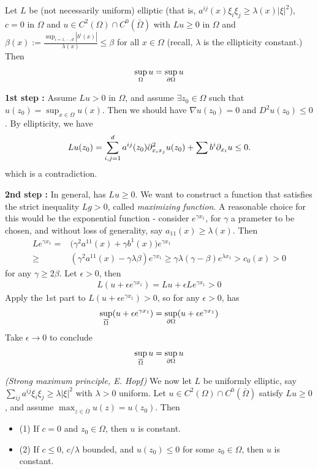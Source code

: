 \documentclass[12pt,a4paper]{article}
\newenvironment{proof}
{\begin{changemargin}{1cm}{0.5cm} 
	}%
	{\end{changemargin}
}
\renewenvironment{i}
{\begin{itemize} 
	}%
	{\end{itemize}
}
\newenvironment{p}
{\begin{proof} 
	}%
	{\end{proof}
}
\begin{document}
\thm Let $L$ be (not necessarily uniform) elliptic (that is, $a^{ij}(x) \xi_i \xi_j \geq \lambda(x) |\xi|^2$), $c=0$ in $\Omega$ and $u\in C^2(\Omega) \cap C^0(\bar{\Omega})$ with $Lu \geq 0$ in $\Omega$ and $\beta(x) := \frac{\sup_{i=1,\cdots,d} |b^i(x)|}{\lambda (x)} \leq\beta$ for all $x\in \Omega$ (recall, $\lambda$ is the ellipticity constant.) Then
\begin{align*}
\sup_{\Omega} u = \sup_{\partial \Omega} u
\end{align*}
\begin{p}
\pf \textbf{1st step :} Assume $Lu >0$ in $\Omega$, and assume $\exists z_0 \in \Omega$ such that $u(z_0) = \sup_{x\in \Omega} u(x)$. Then we should have $\nabla u(z_0) =0$ and $D^2 u(z_0) \leq 0$. By ellipticity, we have 
\begin{align*}
Lu(z_0) = \sum_{i,j=1}^d a^{ij}(z_0) \partial^2_{x_i x_j} u(z_0) + \sum b^i \partial_{x_i} u \leq 0.
\end{align*}
which is a contradiction.
\s

\textbf{2nd step :} In general, has $Lu \geq 0$. We want to construct a function that satisfies the strict inequality $Lg > 0$, called \emph{maximizing function}. A reasonable choice for this would be the exponential function - consider $e^{\gamma x_1}$, for $\gamma$ a prameter to be chosen, and without loss of generality, say $a_{11}(x) \geq \lambda(x)$. Then
\begin{align*}
Le^{\gamma x_1} = & \big( \gamma^2 a^{11}(x) + \gamma b^1(x) \big) e^{\gamma x_1} \\
\geq & (\gamma^2 a^{11}(x) - \gamma \lambda \beta )e^{\gamma x_1} \geq \gamma \lambda (\gamma - \beta) e^{\lambda x_1} > c_0(x) > 0
\end{align*}
for any $\gamma \geq 2\beta$. Let $\epsilon >0$, then
\begin{align*}
L (u + \epsilon e^{\gamma x_1}) = Lu + \epsilon L e^{\gamma x_1} >0
\end{align*}
Apply the 1st part to $L(u + \epsilon e^{\gamma x_1}) >0$, so for any $\epsilon >0$, has
\begin{align*}
\sup_{\overline{\Omega}} (u + \epsilon e^{\gamma x_1}) = \sup_{\partial \Omega} (u + \epsilon e^{\gamma x_1})
\end{align*}
Take $\epsilon \rightarrow 0$ to conclude
\begin{align*}
\sup_{\overline{\Omega}} u = \sup_{\partial \Omega} u
\end{align*}
\eop
\end{p}
\s

\thm \emph{(Strong maximum principle, E. Hopf)}  We now let $L$ be uniformly elliptic, say $\sum_{ij} a^{ij} \xi_i \xi_j \geq \lambda |\xi|^2$ with $\lambda>0$ uniform. Let $u\in C^2(\Omega) \cap C^0(\bar{\Omega})$ satisfy $Lu \geq 0$, and assume $\max_{z\in \bar{\Omega}} u(z) = u(z_0)$. Then
\begin{i}
\item[(1)] If $c=0$ and $z_0 \in \Omega$, then $u$ is constant.
\item[(2)] If $c\leq 0$, $c/\lambda$ bounded, and $u(z_0) \leq 0$ for some $z_0 \in \Omega$, then $u$ is constant.
\end{i}
\s
\end{document}

